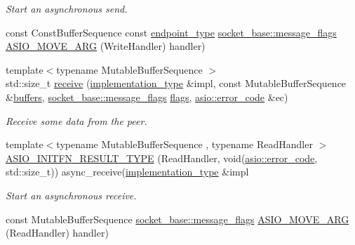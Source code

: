 \begin{DoxyCompactItemize}
\begin{DoxyCompactList}\small\item\em Start an asynchronous send. \end{DoxyCompactList}\item 
const Const\+Buffer\+Sequence const \hyperlink{classasio_1_1raw__socket__service_a8278f352f4e4424d431320f924e8b496}{endpoint\+\_\+type} \hyperlink{classasio_1_1socket__base_ac3cf77465dfedfe1979b5415cf32cc94}{socket\+\_\+base\+::message\+\_\+flags} \hyperlink{classasio_1_1raw__socket__service_a07fa507d5f366daa737ffb2abdfb653c}{A\+S\+I\+O\+\_\+\+M\+O\+V\+E\+\_\+\+A\+R\+G} (Write\+Handler) handler)
\item 
{\footnotesize template$<$typename Mutable\+Buffer\+Sequence $>$ }\\std\+::size\+\_\+t \hyperlink{classasio_1_1raw__socket__service_a30612ca61a04b409472a9c4746c327bf}{receive} (\hyperlink{classasio_1_1raw__socket__service_aa2e0ef73d6504fbcab510cb835e9e3d9}{implementation\+\_\+type} \&impl, const Mutable\+Buffer\+Sequence \&\hyperlink{classasio_1_1raw__socket__service_a45cf013e3c3889296ee65fd303253db6}{buffers}, \hyperlink{classasio_1_1socket__base_ac3cf77465dfedfe1979b5415cf32cc94}{socket\+\_\+base\+::message\+\_\+flags} \hyperlink{classasio_1_1raw__socket__service_a735387eb54985dafc0ba5314df84590a}{flags}, \hyperlink{classasio_1_1error__code}{asio\+::error\+\_\+code} \&ec)
\begin{DoxyCompactList}\small\item\em Receive some data from the peer. \end{DoxyCompactList}\item 
{\footnotesize template$<$typename Mutable\+Buffer\+Sequence , typename Read\+Handler $>$ }\\\hyperlink{classasio_1_1raw__socket__service_a1aedfe496159540e08c88f56510f0978}{A\+S\+I\+O\+\_\+\+I\+N\+I\+T\+F\+N\+\_\+\+R\+E\+S\+U\+L\+T\+\_\+\+T\+Y\+P\+E} (Read\+Handler, void(\hyperlink{classasio_1_1error__code}{asio\+::error\+\_\+code}, std\+::size\+\_\+t)) async\+\_\+receive(\hyperlink{classasio_1_1raw__socket__service_aa2e0ef73d6504fbcab510cb835e9e3d9}{implementation\+\_\+type} \&impl
\begin{DoxyCompactList}\small\item\em Start an asynchronous receive. \end{DoxyCompactList}\item 
const Mutable\+Buffer\+Sequence \hyperlink{classasio_1_1socket__base_ac3cf77465dfedfe1979b5415cf32cc94}{socket\+\_\+base\+::message\+\_\+flags} \hyperlink{classasio_1_1raw__socket__service_a0c23147b6b5bb3cabb9abfee44dc9109}{A\+S\+I\+O\+\_\+\+M\+O\+V\+E\+\_\+\+A\+R\+G} (Read\+Handler) handler)

\end{DoxyCompactItemize}
